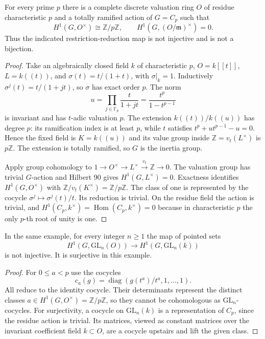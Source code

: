 \begin{proposition}
\label{D:wild-units}
For every prime $p$ there is a complete discrete valuation ring $O$
of residue characteristic $p$ and a totally ramified action of
$G=C_p$ such that
\[
 H^1(G,O^\times)\cong\mathbb Z/p\mathbb Z,
 \qquad H^1(G,(O/\mathfrak m)^\times)=0.
\]
Thus the indicated restriction-reduction map is not injective and
is not a bijection.
\end{proposition}
\begin{proof}
Take an algebraically closed field $k$ of characteristic $p$,
$O=k[[t]]$, $L=k((t))$, and
$\sigma(t)=t/(1+t)$, with $\sigma|_k=1$.
Inductively $\sigma^j(t)=t/(1+jt)$, so $\sigma$ has exact order $p$.
The norm
\[
 u=\prod_{j\in\mathbb F_p}\frac{t}{1+jt}
   =\frac{t^p}{1-t^{p-1}}
\]
is invariant and has $t$-adic valuation $p$. The extension
$k((t))/k((u))$ has degree $p$: its ramification index is at least
$p$, while $t$ satisfies $t^p+ut^{p-1}-u=0$. Hence the fixed field
is $K=k((u))$ and its value group inside $\mathbb Z=v_t(L^\times)$
is $p\mathbb Z$. The extension is totally ramified, so $G$ is the
inertia group.

Apply group cohomology to
$1\to O^\times\to L^\times\xrightarrow{v_t}\mathbb Z\to0$.
The valuation group has trivial $G$-action and Hilbert 90 gives
$H^1(G,L^\times)=0$. Exactness identifies $H^1(G,O^\times)$ with
$\mathbb Z/v_t(K^\times)=\mathbb Z/p\mathbb Z$. The class of one
is represented by the cocycle $\sigma^j\mapsto\sigma^j(t)/t$.
Its reduction is trivial. On the residue field the action is trivial,
and $H^1(C_p,k^\times)=\operatorname{Hom}(C_p,k^\times)=0$ because
in characteristic $p$ the only $p$-th root of unity is one.
\end{proof}

\begin{proposition}
\label{D:wild-GLn}
In the same example, for every integer $n\geq1$ the map of pointed sets
\[
 H^1(G,\mathrm{GL}_n(O))\longrightarrow
 H^1(G,\mathrm{GL}_n(k))
\]
is not injective. It is surjective in this example.
\end{proposition}
\begin{proof}
For $0\leq a<p$ use the cocycles
\[
 c_a(g)=\operatorname{diag}(g(t^a)/t^a,1,\ldots,1).
\]
All reduce to the identity cocycle. Their determinants represent the
distinct classes $a\in H^1(G,O^\times)=\mathbb Z/p\mathbb Z$,
so they cannot be cohomologous as $\mathrm{GL}_n$-cocycles.
For surjectivity, a cocycle on $\mathrm{GL}_n(k)$ is a representation
of $C_p$, since the residue action is trivial. Its matrices, viewed
as constant matrices over the invariant coefficient field $k\subset O$,
are a cocycle upstairs and lift the given class.
\end{proof}

